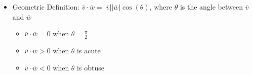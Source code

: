 \begin{itemize}
\begin{itemize}
      \item Geometric Definition: $\overline{v} \cdot \overline{w} = |\overline{v}||\overline{w}|\cos(\theta)$, where $\theta$ is the angle between $\overline{v}$ and $\overline{w}$

        \begin{itemize}

          \item $\overline{v}\cdot\overline{w} = 0$ when $\theta = \frac{\pi}{2}$

          \item $\overline{v}\cdot\overline{w} > 0$ when $\theta$ is acute

          \item $\overline{v}\cdot\overline{w} < 0$ when $\theta$ is obtuse

        \end{itemize}

    \end{itemize}

\end{itemize}




